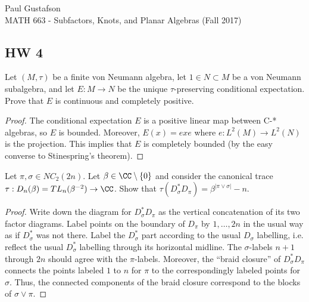 \documentclass{article}
\begin{document}
\noindent Paul Gustafson\\
\noindent MATH 663 - Subfactors, Knots, and Planar Algebras (Fall 2017)

\subsection*{HW 4}
 Let $(M, \tau)$ be a finite von Neumann algebra, let $1 \in N \subset M$ be a von Neumann subalgebra, and let $E: M \to N$ be the unique $\tau$-preserving conditional expectation.  Prove that $E$ is continuous and completely positive.

\begin{proof}
  The conditional expectation $E$ is a positive linear map between C-* algebras, so $E$ is bounded. Moreover, $E(x) = exe$ where $e:L^2(M) \to L^2(N)$ is the projection.  This implies that $E$ is completely bounded (by the easy converse to Stinespring's theorem).
\end{proof}

 Let $\pi, \sigma \in NC_2(2n)$.  Let $\beta \in \CC \setminus \{0\}$ and consider the canonical trace $\tau : D_n(\beta) = TL_n(\beta^{-2}) \to \CC$.  Show that $\tau(D_\sigma^* D_\pi) = \beta^{|\pi \vee \sigma|} - n$.
\begin{proof}
  Write down the diagram for $D_\sigma^* D_\pi$ as the vertical concatenation of its two factor diagrams.  Label points on the boundary of $D_\pi$ by $1, \ldots, 2n$ in the usual way as if $D_\sigma^*$ was not there.  Label the $D_\sigma^*$ part according to the usual $D_\sigma$ labelling, i.e. reflect the usual $D_\sigma^*$ labelling through its horizontal midline. The $\sigma$-labels $n+1$ through $2n$ should agree with the $\pi$-labels. Moreover, the ``braid closure'' of $D_\sigma^* D_\pi$ connects the points labeled $1$ to $n$ for $\pi$ to the correspondingly labeled points for $\sigma$.  Thus, the connected components of the braid closure correspond to the blocks of $\sigma \vee \pi$. 
\end{proof}
\end{document}
